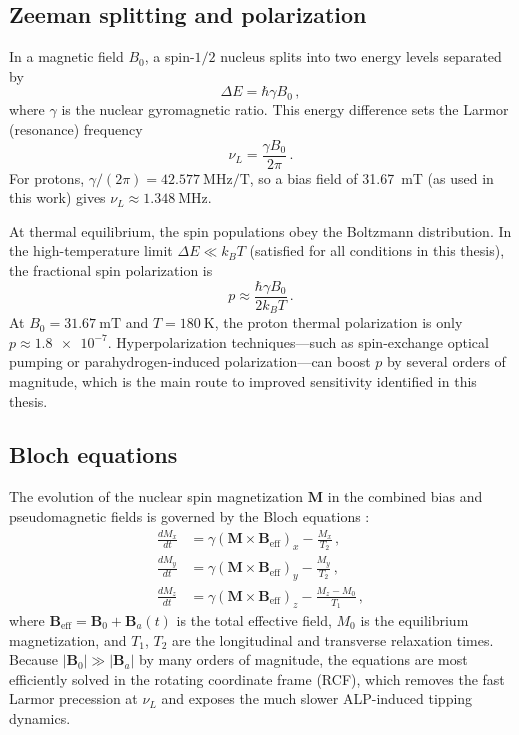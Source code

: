 \subsection{Zeeman splitting and polarization}\label{sec:NMR:Zeeman}
In a magnetic field $B_0$, a spin-$1/2$ nucleus splits into two energy levels separated by
\begin{equation}
    \Delta E = \hbar \gamma B_0
    \,,\label{eq:Zeeman}
\end{equation}
where $\gamma$ is the nuclear gyromagnetic ratio. This energy difference sets the Larmor (resonance) frequency
\begin{equation}
    \nu_L = \frac{\gamma B_0}{2\pi}
    \,.\label{eq:Larmor}
\end{equation}
For protons, $\gamma/(2\pi) = \SI{42.577}{\MHz/\tesla}$, so a bias field of \SI{31.67}{\milli\tesla} (as used in this work) gives $\nu_L \approx \SI{1.348}{\MHz}$.

At thermal equilibrium, the spin populations obey the Boltzmann distribution. In the high-temperature limit $\Delta E \ll k_B T$ (satisfied for all conditions in this thesis), the fractional spin polarization is
\begin{equation}
    p \approx \frac{\hbar \gamma B_0}{2 k_B T}
    \,.\label{eq:thermalp}
\end{equation}
At $B_0 = \SI{31.67}{\milli\tesla}$ and $T = \SI{180}{\kelvin}$, the proton thermal polarization is only $p \approx \num{1.8e-7}$. Hyperpolarization techniques---such as spin-exchange optical pumping or parahydrogen-induced polarization---can boost $p$ by several orders of magnitude, which is the main route to improved sensitivity identified in this thesis.

\subsection{Bloch equations}\label{sec:theory:bloch}
The evolution of the nuclear spin magnetization $\mathbf{M}$ in the combined bias and pseudomagnetic fields is governed by the Bloch equations \cite{Abragam1961_NuclearMagnetism}:
\begin{align}
    \frac{dM_x}{dt} &= \gamma\left(\mathbf{M}\times\mathbf{B}_\mathrm{eff}\right)_x - \frac{M_x}{T_2}\,,\label{eq:bloch_x}\\
    \frac{dM_y}{dt} &= \gamma\left(\mathbf{M}\times\mathbf{B}_\mathrm{eff}\right)_y - \frac{M_y}{T_2}\,,\label{eq:bloch_y}\\
    \frac{dM_z}{dt} &= \gamma\left(\mathbf{M}\times\mathbf{B}_\mathrm{eff}\right)_z - \frac{M_z-M_0}{T_1}\,,\label{eq:bloch_z}
\end{align}
where $\mathbf{B}_\mathrm{eff} = \mathbf{B}_0 + \mathbf{B}_a(t)$ is the total effective field, $M_0$ is the equilibrium magnetization, and $T_1$, $T_2$ are the longitudinal and transverse relaxation times. Because $|\mathbf{B}_0| \gg |\mathbf{B}_a|$ by many orders of magnitude, the equations are most efficiently solved in the rotating coordinate frame (RCF), which removes the fast Larmor precession at $\nu_L$ and exposes the much slower ALP-induced tipping dynamics.

